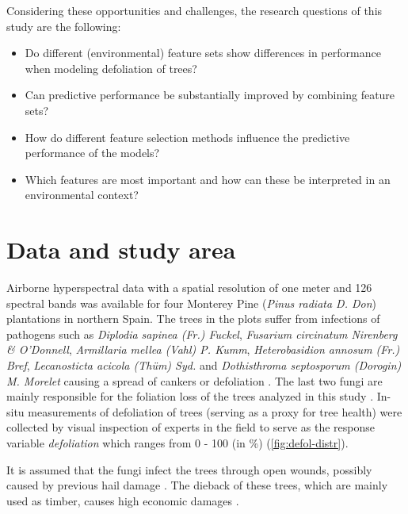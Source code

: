 \documentclass[final]{IEEEtran}
\begin{document}
Considering these opportunities and challenges, the research questions of this study are the following:

\begin{itemize}

	\item Do different (environmental) feature sets show differences in performance when modeling defoliation of trees?

	\item Can predictive performance be substantially improved by combining feature sets?

	\item How do different feature selection methods influence the predictive performance of the models?

	\item Which features are most important and how can these be interpreted in an environmental context?

\end{itemize}

\section{Data and study area}

Airborne hyperspectral data with a spatial resolution of one meter and 126 spectral bands was available for four Monterey Pine (\textit{Pinus radiata D. Don}) plantations in northern Spain.
The trees in the plots suffer from infections of pathogens such as \textit{Diplodia sapinea (Fr.) Fuckel}, \textit{Fusarium circinatum Nirenberg \& O'Donnell}, \textit{Armillaria mellea (Vahl) P. Kumm}, \textit{Heterobasidion annosum (Fr.) Bref}, \textit{Lecanosticta acicola (Thüm) Syd.} and \textit{Dothisthroma septosporum (Dorogin) M. Morelet} causing a spread of cankers or defoliation \cite{mesanza2016, iturritxa2017}.
The last two fungi are mainly responsible for the foliation loss of the trees analyzed in this study \cite{iturritxa2014}.
In-situ measurements of defoliation of trees (serving as a proxy for tree health) were collected by visual inspection of experts in the field to serve as the response variable \textit{defoliation} which ranges from 0 - 100 (in \%) (\autoref{fig:defol-distr}).

It is assumed that the fungi infect the trees through open wounds, possibly caused by previous hail damage \cite{iturritxa2014}.
The dieback of these trees, which are mainly used as timber, causes high economic damages \cite{ganley2009}.
\end{document}
